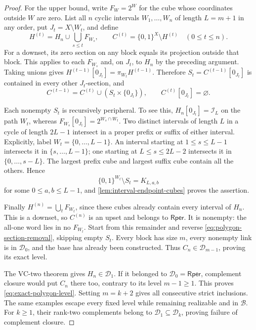 \documentclass[11pt]{article}
\theoremstyle{definition}
\newcommand{\bits}{\{0,1\}}
\newcommand{\Rper}{\mathsf{Rper}}
\begin{document}
\begin{proof}
For the upper bound, write $F_W=2^W$ for the cube whose coordinates
outside $W$ are zero. List all $n$ cyclic intervals
$W_1,\ldots,W_n$ of length $L=m+1$ in any order, put
$J_t=X\setminus W_t$, and define
\[
 H^{(t)}=H_n\cup\bigcup_{s\le t}F_{W_s},\qquad
 C^{(t)}=\bits^X\setminus H^{(t)}\quad(0\le t\le n).
\]
For a downset, its zero section on any block equals its projection
outside that block. This applies to each $F_{W_s}$ and, on $J_t$,
to $H_n$ by the preceding argument. Taking unions gives
$H^{(t-1)}[0_{J_t}]=\pi_{W_t}H^{(t-1)}$.
Therefore $S_t=C^{(t-1)}[0_{J_t}]$ is contained in every other
$J_t$-section, and
\begin{equation}\label{eq:polygon-section-removal}
 C^{(t-1)}=C^{(t)}\cup(S_t\times\{0_{J_t}\}),\qquad
 C^{(t)}[0_{J_t}]=\varnothing.
\end{equation}

Each nonempty $S_t$ is recursively peripheral. To see this,
$H_n[0_{J_t}]=\mathcal I_L$ on the path $W_t$, whereas
$F_{W_s}[0_{J_t}]=2^{W_s\cap W_t}$. Two distinct intervals of length
$L$ in a cycle of length $2L-1$ intersect in a proper prefix or suffix
of either interval. Explicitly, label $W_t=\{0,\ldots,L-1\}$.
An interval starting at $1\le s\le L-1$ intersects it in
$\{s,\ldots,L-1\}$; one starting at $L\le s\le2L-2$ intersects
it in $\{0,\ldots,s-L\}$. The largest prefix cube and largest
suffix cube contain all the others. Hence
\[
 \bits^{W_t}\setminus S_t=K_{L,a,b}
\]
for some $0\le a,b\le L-1$, and
\cref{lem:interval-endpoint-cubes} proves the assertion.

Finally $H^{(n)}=\bigcup_tF_{W_t}$, since these cubes already contain
every interval of $H_n$. This is a downset, so $C^{(n)}$ is an upset
and belongs to $\Rper$. It is nonempty: the all-one word lies in no
$F_{W_t}$. Start from this remainder and reverse
\eqref{eq:polygon-section-removal}, skipping empty $S_t$.
Every block has size $m$, every nonempty link is in $\mathcal D_0$,
and the base has already been constructed. Thus
$C_n\in\mathcal D_{m-1}$, proving its exact level.

The VC-two theorem gives $H_n\in\mathcal D_1$. If it belonged to
$\mathcal D_0=\Rper$, complement closure would put $C_n$ there too,
contrary to its level $m-1\ge1$. This proves
\eqref{eq:exact-polygon-level}. Setting $m=k+2$ gives all consecutive
strict inclusions. The same examples escape every fixed level while
remaining realizable and in $\mathcal B$. For $k\ge1$, their rank-two
complements belong to $\mathcal D_1\subseteq\mathcal D_k$, proving
failure of complement closure.
\end{proof}
\end{document}
